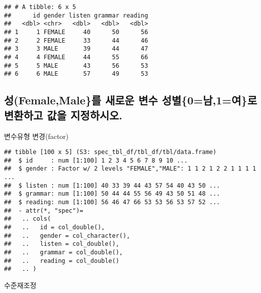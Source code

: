 \documentclass[
]{article}
\newenvironment{Shaded}{\begin{snugshade}}{\end{snugshade}}
\newcommand{\DataTypeTok}[1]{\textcolor[rgb]{0.13,0.29,0.53}{#1}}
\newcommand{\KeywordTok}[1]{\textcolor[rgb]{0.13,0.29,0.53}{\textbf{#1}}}
\newcommand{\NormalTok}[1]{#1}
\newcommand{\OperatorTok}[1]{\textcolor[rgb]{0.81,0.36,0.00}{\textbf{#1}}}
\newcommand{\StringTok}[1]{\textcolor[rgb]{0.31,0.60,0.02}{#1}}
\begin{document}
\begin{verbatim}
## # A tibble: 6 x 5
##      id gender listen grammar reading
##   <dbl> <chr>   <dbl>   <dbl>   <dbl>
## 1     1 FEMALE     40      50      56
## 2     2 FEMALE     33      44      46
## 3     3 MALE       39      44      47
## 4     4 FEMALE     44      55      66
## 5     5 MALE       43      56      53
## 6     6 MALE       57      49      53
\end{verbatim}

\hypertarget{uxc131femalemaleuxb97c-uxc0c8uxb85cuxc6b4-uxbcc0uxc218-uxc131uxbcc40uxb0a81uxc5ecuxb85c-uxbcc0uxd658uxd558uxace0-uxac12uxc744-uxc9c0uxc815uxd558uxc2dcuxc624.}{%
\subsection{성(Female,Male\}를 새로운 변수 성별\{0=남,1=여\}로 변환하고
값을
지정하시오.}\label{uxc131femalemaleuxb97c-uxc0c8uxb85cuxc6b4-uxbcc0uxc218-uxc131uxbcc40uxb0a81uxc5ecuxb85c-uxbcc0uxd658uxd558uxace0-uxac12uxc744-uxc9c0uxc815uxd558uxc2dcuxc624.}}

변수유형 변경(factor)

\begin{Shaded}
\end{Shaded}

\begin{verbatim}
## tibble [100 x 5] (S3: spec_tbl_df/tbl_df/tbl/data.frame)
##  $ id     : num [1:100] 1 2 3 4 5 6 7 8 9 10 ...
##  $ gender : Factor w/ 2 levels "FEMALE","MALE": 1 1 2 1 2 2 1 1 1 1 ...
##  $ listen : num [1:100] 40 33 39 44 43 57 54 40 43 50 ...
##  $ grammar: num [1:100] 50 44 44 55 56 49 43 50 51 48 ...
##  $ reading: num [1:100] 56 46 47 66 53 53 56 53 57 52 ...
##  - attr(*, "spec")=
##   .. cols(
##   ..   id = col_double(),
##   ..   gender = col_character(),
##   ..   listen = col_double(),
##   ..   grammar = col_double(),
##   ..   reading = col_double()
##   .. )
\end{verbatim}

수준재조정

\begin{Shaded}
\end{Shaded}
\end{document}
